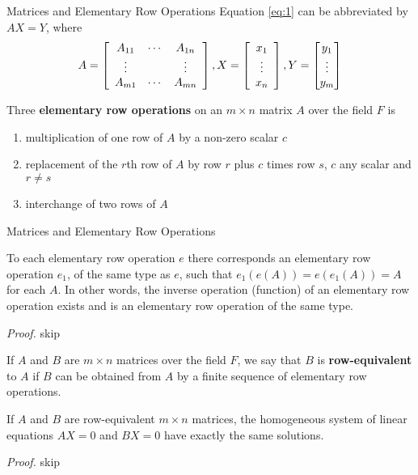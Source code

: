 \documentclass[8pt]{beamer}
\newcommand{\tb}[1]{\textbf{#1}}
\newcommand{\ti}[1]{\textit{#1}}
\begin{document}
\begin{frame}{Matrices and Elementary Row Operations}
  Equation \ref{eq:1} can be abbreviated by
  $AX = Y$, where
  \[
  A = \left[ \begin{array}{ccc}
    A_{11} & \cdots & A_{1n} \\
    \vdots & \empty & \vdots \\
    A_{m1} & \cdots & A_{mn}
  \end{array} \right], 
  X = \left[ \begin{array}{c}
  x_1 \\ \vdots  \\ x_n
  \end{array} \right],
  Y = \left[\begin{matrix}
    y_1 \\ \vdots \\ y_m
  \end{matrix} \right]
  \]


  Three \tb{elementary row operations} on an $m \times n$ matrix $A$ over the field $F$ is

  \begin{enumerate}
    \item multiplication of one row of $A$ by a non-zero scalar $c$
    \item replacement of the $r$th row of $A$ by row $r$ plus $c$ times row $s$, $c$ any scalar and $r \neq s$
    \item interchange of two rows of $A$

  \end{enumerate}
\end{frame}

\begin{frame}{Matrices and Elementary Row Operations}
  \begin{theorem}
    To each elementary row operation $e$ there corresponds an elementary row operation $e_1$, of the same type as $e$, such that $e_1 (e(A)) = e(e_1(A)) = A$ for each $A$. In other words, the inverse operation (function) of an elementary row operation exists and is an elementary row operation of the same type. 
  \end{theorem}
  \ti{Proof.} skip

  \begin{definition}
    If $A$ and $B$ are $m \times n$ matrices over the field $F$, we say that $B$ is \tb{row-equivalent} to $A$ if $B$ can be obtained from $A$ by a finite sequence of elementary row operations.
  \end{definition}


  \begin{theorem}
    If $A$ and $B$ are row-equivalent $m \times n $ matrices, the homogeneous system of linear equations $AX = 0$ and $BX = 0$ have exactly the same solutions.
  \end{theorem}
  \ti{Proof.} skip
\end{frame}
\end{document}
